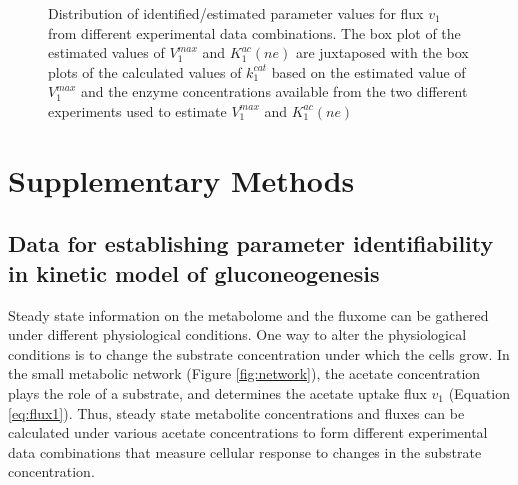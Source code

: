 \documentclass[10pt]{article}
\begin{document}
\begin{figure}[!tbhp]
	\caption{Distribution of identified/estimated parameter values for flux $v_1$ from different experimental data combinations. The box plot of the estimated values of $V_1^{max}$ and $K_1^{ac}(ne)$ are juxtaposed with the box plots of the calculated values of $k_1^{cat}$ based on the estimated value of $V_1^{max}$ and the enzyme concentrations available from the two different experiments used to estimate $V_1^{max}$ and $K_1^{ac}(ne)$}\label{fig:parameter_value_v1_v1max_kcat}
\end{figure}	

\clearpage

\section{Supplementary Methods}
\subsection{Data for establishing parameter identifiability in kinetic model of gluconeogenesis}\label{sec:experiments}
Steady state information on the metabolome and the fluxome can be gathered under different physiological conditions. One way to alter the physiological conditions is to change the substrate concentration under which the cells grow. In the small metabolic network (Figure \ref{fig:network}), the acetate concentration plays the role of a substrate, and  determines the acetate uptake flux $v_1$ (Equation \ref{eq:flux1}). Thus, steady state metabolite concentrations and fluxes can be calculated under various acetate concentrations to form different experimental data combinations that measure cellular response to changes in the substrate concentration. 
\end{document}
